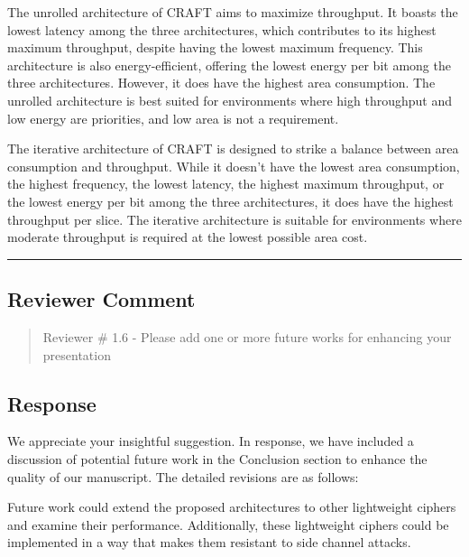 The unrolled architecture of CRAFT aims to maximize throughput. It boasts the lowest latency among the three architectures, which contributes to its highest maximum throughput, despite having the lowest maximum frequency. This architecture is also energy-efficient, offering the lowest energy per bit among the three architectures. However, it does have the highest area consumption. The unrolled architecture is best suited for environments where high throughput and low energy are priorities, and low area is not a requirement.

The iterative architecture of CRAFT is designed to strike a balance between area consumption and throughput. While it doesn't have the lowest area consumption, the highest frequency, the lowest latency, the highest maximum throughput, or the lowest energy per bit among the three architectures, it does have the highest throughput per slice. The iterative architecture is suitable for environments where moderate throughput is required at the lowest possible area cost.

\color{black}

\noindent\rule{\linewidth}{2.0pt}

\subsection{Reviewer Comment}
\begin{mdframed}
	\begin{quote}
		Reviewer \# 1.6 - Please add one or more future works for enhancing your presentation
	\end{quote}
\end{mdframed}

\subsection{Response}

We appreciate your insightful suggestion. In response, we have included a discussion of potential future work in the Conclusion section to enhance the quality of our manuscript. The detailed revisions are as follows:

\color{blue}

Future work could extend the proposed architectures to other lightweight ciphers and examine their performance. Additionally, these lightweight ciphers could be implemented in a way that makes them resistant to side channel attacks.

\color{black}

